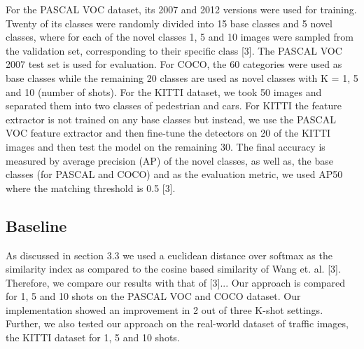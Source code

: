 \documentclass{article}
\begin{document}
For the PASCAL VOC dataset, its 2007 and 2012 versions were used for training. Twenty of its classes were randomly divided into 15 base classes and 5 novel classes, where for each of the novel classes 1,  5 and 10 images were sampled from the validation set, corresponding to their specific class [3]. The PASCAL VOC 2007 test set is used for evaluation. For COCO, the 60 categories were used as base classes while the remaining 20 classes are used as novel classes with  K = 1, 5 and 10 (number of shots). For the KITTI dataset, we took 50 images and separated them into two classes of pedestrian and cars. For KITTI the feature extractor is not trained on any base classes but instead, we use the PASCAL VOC feature extractor and then fine-tune the detectors on 20 of the KITTI images and then test the model on the remaining 30. The final accuracy is measured by average precision (AP) of the novel classes, as well as, the base classes (for PASCAL and COCO)  and as the evaluation metric, we used AP50 where the matching threshold is 0.5 [3].

\subsection{Baseline}
As discussed in section 3.3 we used a euclidean distance over softmax as the similarity index as compared to the cosine based similarity of Wang et. al. [3]. Therefore, we compare our results with that of [3]... Our approach is compared for 1, 5 and 10 shots on the PASCAL VOC and COCO dataset. Our implementation showed an improvement in 2 out of three K-shot settings. Further, we also tested our approach on the real-world dataset of traffic images, the KITTI dataset for 1, 5 and 10 shots.  
\end{document}

